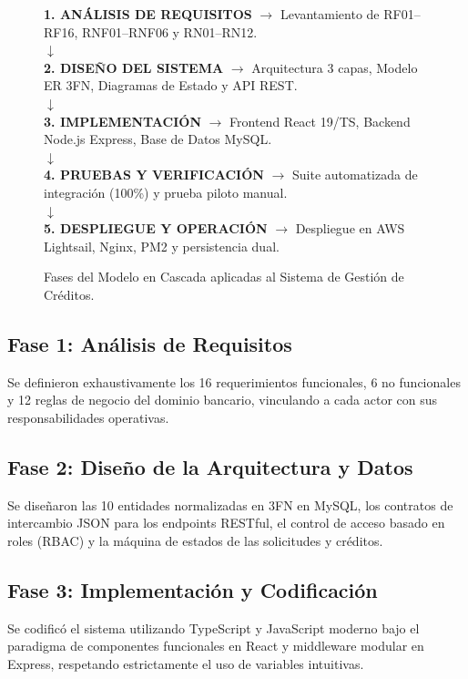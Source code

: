 \documentclass[11pt,letterpaper]{report}
\begin{document}
\begin{figure}[htbp]
\centering
\begin{tcolorbox}[colback=white,colframe=bankPrimary,title=Ciclo de Vida en Cascada del Proyecto]
\centering
\textbf{1. ANÁLISIS DE REQUISITOS} $\longrightarrow$ Levantamiento de RF01--RF16, RNF01--RNF06 y RN01--RN12.\\
$\boldsymbol{\downarrow}$\\
\textbf{2. DISEÑO DEL SISTEMA} $\longrightarrow$ Arquitectura 3 capas, Modelo ER 3FN, Diagramas de Estado y API REST.\\
$\boldsymbol{\downarrow}$\\
\textbf{3. IMPLEMENTACIÓN} $\longrightarrow$ Frontend React 19/TS, Backend Node.js Express, Base de Datos MySQL.\\
$\boldsymbol{\downarrow}$\\
\textbf{4. PRUEBAS Y VERIFICACIÓN} $\longrightarrow$ Suite automatizada de integración (100\%) y prueba piloto manual.\\
$\boldsymbol{\downarrow}$\\
\textbf{5. DESPLIEGUE Y OPERACIÓN} $\longrightarrow$ Despliegue en AWS Lightsail, Nginx, PM2 y persistencia dual.
\end{tcolorbox}
\caption{Fases del Modelo en Cascada aplicadas al Sistema de Gestión de Créditos.}
\end{figure}

\subsection{Fase 1: Análisis de Requisitos}
Se definieron exhaustivamente los 16 requerimientos funcionales, 6 no funcionales y 12 reglas de negocio del dominio bancario, vinculando a cada actor con sus responsabilidades operativas.

\subsection{Fase 2: Diseño de la Arquitectura y Datos}
Se diseñaron las 10 entidades normalizadas en 3FN en MySQL, los contratos de intercambio JSON para los endpoints RESTful, el control de acceso basado en roles (RBAC) y la máquina de estados de las solicitudes y créditos.

\subsection{Fase 3: Implementación y Codificación}
Se codificó el sistema utilizando TypeScript y JavaScript moderno bajo el paradigma de componentes funcionales en React y middleware modular en Express, respetando estrictamente el uso de variables intuitivas.
\end{document}
